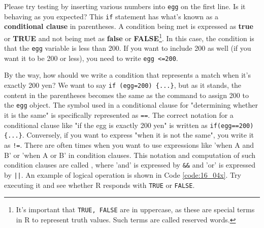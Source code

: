 \documentclass{ltjsbook}
\begin{document}
Please try testing by inserting various numbers into \verb|egg| on the first line. Is it behaving as you expected?
This \texttt{if} statement has what's known as a \textbf{conditional clause} in parentheses. A condition being met is expressed as \textbf{true} or \textbf{TRUE} and not being met as \textbf{false} or \textbf{FALSE}\footnote{It's important that \texttt{TRUE, FALSE} are in uppercase, as these are special terms in R to represent truth values. Such terms are called reserved words.}. In this case, the condition is that the \verb|egg| variable is less than 200. If you want to include 200 as well (if you want it to be 200 or less), you need to write \verb|egg <=200|.

By the way, how should we write a condition that represents a match when it's exactly 200 yen? We want to say \verb|if (egg=200) {...}|, but as it stands, the content in the parentheses becomes the same as the command to assign 200 to the \verb|egg| object.
The symbol used in a conditional clause for "determining whether it is the same" is specifically represented as \verb|==|. The correct notation for a conditional clause like "if the egg is exactly 200 yen" is written as \verb|if(egg==200){...}|. Conversely, if you want to express "when it is not the same", you write it as \verb|!=|.
There are often times when you want to use expressions like 'when A and B' or 'when A or B' in condition clauses. This notation and computation of such condition clauses are called , where 'and' is expressed by \verb|&&| and 'or' is expressed by \texttt{||}.
An example of logical operation is shown in Code \ref{code:16_04x}. Try executing it and see whether R responds with \verb|TRUE| or \verb|FALSE|.
\end{document}
